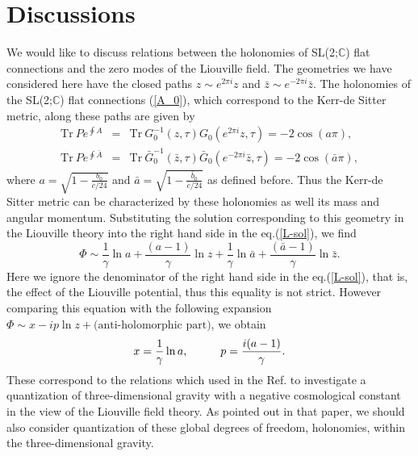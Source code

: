 \documentclass[a4paper,11pt]{article}
\begin{document}
\section{Discussions}
We would like to discuss relations between the holonomies 
of SL(2;$\mathbb{C}$) flat connections and the zero modes 
of the Liouville field.
The geometries we have considered here have the closed paths 
$z\sim e^{2\pi i}z$ and  $\bar{z}\sim e^{-2\pi i}\bar{z}$.
The holonomies of the SL(2;$\mathbb{C}$) flat connections (\ref{A_0}), 
which correspond to the Kerr-de Sitter metric, along these paths 
are given by
\begin{eqnarray}
\mbox{Tr} \ Pe^{\oint A}
 &=&\mbox{Tr} \ G_0^{-1}(z,\tau)G_0(e^{2\pi i}z, \tau)
  =-2\cos(a\pi), \nonumber \\ 
\mbox{Tr} \ Pe^{\oint \bar{A}}
 &=& \mbox{Tr} \ \bar{G}_0^{-1}(\bar{z},\tau)
       \bar{G}_0(e^{-2\pi i}\bar{z}, \tau)
  =-2\cos(\bar{a}\pi), 
\end{eqnarray}
where $a=\sqrt{1-\frac{b_0}{c/24}}$ and 
$\bar{a}=\sqrt{1-\frac{\bar{b}_0}{c/24}}$ as defined before.
Thus the Kerr-de Sitter metric can be characterized by these holonomies 
as well its mass and angular momentum.
Substituting the solution corresponding to this geometry 
in the Liouville theory into the right hand side 
in the eq.(\ref{L-sol}), 
we find 
\begin{equation}
\Phi \sim \frac{1}{\gamma}\ln a + \frac{(a-1)}{\gamma}\ln z
          +\frac{1}{\gamma}\ln \bar{a} 
            + \frac{(\bar{a}-1)}{\gamma}\ln \bar{z}.
\end{equation}
Here we ignore the denominator of the right hand side 
in the eq.(\ref{L-sol}), that is, the effect of the Liouville potential, 
thus this equality is not strict.
However comparing this equation with the following expansion 
$\Phi \sim x-ip\ln z +\mbox{(anti-holomorphic part)}$,  
we obtain 
\begin{equation}
x=\frac{1}{\gamma}\ln a, \hspace{10mm}
p=\frac{i(a-1)}{\gamma}.
\end{equation}
These correspond to the relations which used in the Ref.\cite{NUY} to 
investigate a quantization of three-dimensional gravity 
with a negative cosmological constant in the view of 
the Liouville field theory.
As pointed out in that paper, we should also consider quantization of 
these global degrees of freedom, holonomies, 
within the three-dimensional gravity.
\end{document}
